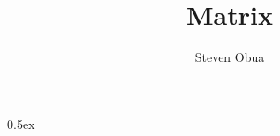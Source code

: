 \documentclass[11pt,a4paper]{article}
\begin{document}
\title{Matrix}
\author{Steven Obua}
\maketitle


\parindent 0pt\parskip 0.5ex


\end{document}
